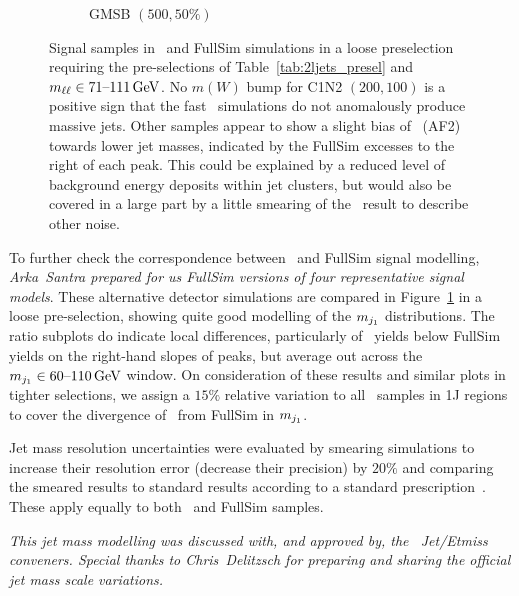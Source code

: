\begin{figure}[tp]
\begin{subfigure}{0.495\textwidth}
\caption{GMSB $(500, 50\%)$}
\end{subfigure}
\caption[
Signal samples in \afii\ and FullSim simulations in a loose preselection
]{%
Signal samples in \afii\ and FullSim simulations in a loose preselection
requiring the pre-selections of Table~\ref{tab:2ljets_presel} and
$\mll \in 71\textrm{--}111\,\eV[G]$.
No $m(W)$ bump for C1N2 $(200, 100)$ is a positive sign that the fast \afii\
simulations do not anomalously produce massive jets.
Other samples appear to show a slight bias of \afii\ (AF2) towards lower jet
masses, indicated by the FullSim excesses to the right of each peak.
This could be explained by a reduced level of background energy deposits within
jet clusters, but would also be covered in a large part by a little smearing of
the \afii\ result to describe other noise.
}
\label{fig:2ljets_jetm_afii_fullsim}
\end{figure}

To further check the correspondence between \afii\ and FullSim signal modelling,
\emph{Arka~Santra prepared for us FullSim versions of four representative
signal models}.
These alternative detector simulations are compared in
Figure~\ref{fig:2ljets_jetm_afii_fullsim} in a loose pre-selection,
showing quite good modelling of the $\mjetone$ distributions.
The ratio subplots do indicate local differences, particularly of \afii\ yields
below FullSim yields on the right-hand slopes of peaks, but average out
across the $\mjetone \in 60\textrm{--}110\,\eV[G]$ window.
On consideration of these results and similar plots in tighter selections,
we assign a $15\%$ relative variation to all \afii\ samples in 1J regions
to cover the divergence of \afii\ from FullSim in $\mjetone$.

Jet mass resolution uncertainties were evaluated by smearing simulations
to increase their resolution error (decrease their precision) by $20\%$
and comparing the smeared results to standard results according to a standard
prescription~\cite{atlas_twiki_jmr}.
These apply equally to both \afii\ and FullSim samples.

\emph{This jet mass modelling was discussed with, and approved by, the \atlas\
Jet/Etmiss conveners. Special thanks to Chris~Delitzsch for preparing and
sharing the official jet mass scale variations.}


